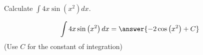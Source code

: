 \documentclass{ximera}
\author{Jim Talamo}
\begin{document}
\begin{exercise}
Calculate $\int 4x \sin\left(x^2\right) dx $.


\[
 \int 4x \sin\left(x^2\right) dx = \answer{ -2\cos\left(x^2\right)  + C } 
\]
(Use $C$ for the constant of integration)

\end{exercise}
\end{document}
